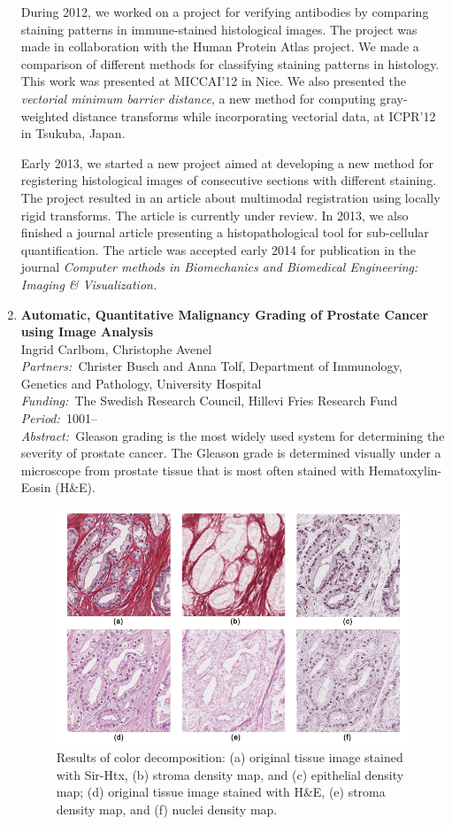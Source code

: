 \documentclass[10pt, a4paper]{article}
\newcommand{\aabstract}[1]{\emph{Abstract:~}#1}
\newcommand{\ffunding}[1]{\emph{Funding:~}#1\\}
\newcommand{\ppartners}[1]{\emph{Partners:~}#1\\}
\newcommand{\pperiod}[1]{\emph{Period:~}#1\\}
\begin{document}
\begin{enumerate}
{During 2012, we worked on a project for verifying antibodies by comparing staining patterns in immune-stained histological images. The project was made in collaboration with the Human Protein Atlas project. We made a comparison of different methods for classifying staining patterns in histology. This work was presented at MICCAI'12 in Nice. We also presented the \textit{vectorial minimum barrier distance}, a new method for computing gray-weighted distance transforms while incorporating vectorial data, at ICPR'12 in Tsukuba, Japan. 

Early 2013, we started a new project aimed at developing a new method for registering histological images of consecutive sections with different staining. The project resulted in an article about multimodal registration using locally rigid transforms. The article is currently under review. In 2013, we also finished a journal article presenting a histopathological tool for sub-cellular quantification. The article was accepted early 2014 for publication in the journal \textit{Computer methods in Biomechanics and Biomedical Engineering: Imaging \& Visualization.}}


\item 
\textbf{Automatic, Quantitative Malignancy Grading of Prostate Cancer using Image Analysis}\\
Ingrid Carlbom, Christophe Avenel\\
\ppartners{Christer Busch and Anna Tolf, Department of Immunology, Genetics and Pathology, University Hospital}
\ffunding{The Swedish Research Council, Hillevi Fries Research Fund}
\pperiod{1001--}
\aabstract{Gleason grading is the most widely used system for determining the severity of prostate cancer. The Gleason grade is determined visually under a microscope from prostate tissue that is most often stained with Hematoxylin-Eosin (H\&E).

\begin{figure}[!htbp]
\centering
\includegraphics[width=.95\textwidth]{figures/research/prostate2.png}
\caption{Results of color decomposition: (a) original tissue image stained with Sir-Htx, (b) stroma density map, and (c) epithelial density map; (d) original tissue image stained with H\&E, (e) stroma density map, and (f) nuclei density map. \label{fig:prostate2}}
\end{figure}

}
\end{enumerate}
\end{document}

